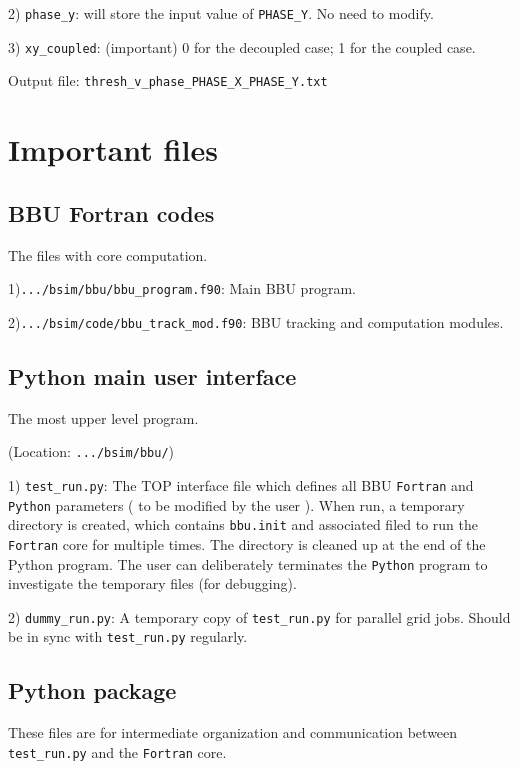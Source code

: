 \documentclass{hitec}
\begin{document}
2) \texttt{phase_y}: will store the input value of \texttt{PHASE_Y}. No need to modify.

3) \texttt{xy_coupled}: (important) 0 for the decoupled case; 1 for the coupled case. 


\bigbreak     
Output file: \texttt{thresh_v_phase_PHASE_X_PHASE_Y.txt} 

\section{Important files}
\subsection{BBU Fortran codes}
The files with core computation.

1)\texttt{.../bsim/bbu/bbu_program.f90}: Main BBU program.

2)\texttt{.../bsim/code/bbu_track_mod.f90}: BBU tracking and computation modules.

\subsection{ Python main user interface}
The most upper level program.

(Location: \texttt{.../bsim/bbu/})

1) \texttt{test_run.py}: 
The TOP interface file which defines all BBU \texttt{Fortran} and \texttt{Python} parameters ( to be modified by the user ).
When run, a temporary directory is created, which contains \texttt{bbu.init} and associated filed to run the \texttt{Fortran} core for multiple times. The directory is cleaned up at the end of the Python program. The user can deliberately terminates the \texttt{Python} program to investigate the temporary files (for debugging).

2) \texttt{dummy_run.py}: 
A temporary copy of \texttt{test_run.py} for parallel grid jobs. Should be in sync with \texttt{test_run.py} regularly.  

\subsection{Python package}
These files are for intermediate  organization and communication between \texttt{test_run.py} and the \texttt{Fortran} core.
\end{document}
